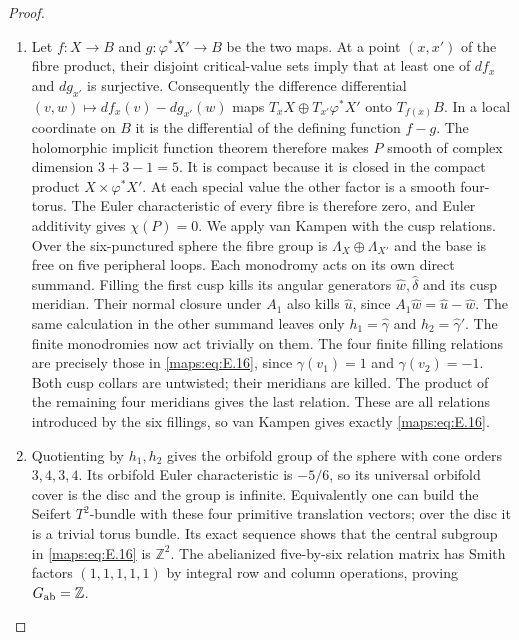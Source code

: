 \begin{proof}
\begin{enumerate}[label=\arabic*.,leftmargin=*]
\item Let $f:X\to B$ and $g:\varphi^*X'\to B$ be the two maps.
At a point $(x,x')$ of the fibre product, their disjoint critical-value
sets imply that at least one of $df_x$ and $dg_{x'}$ is surjective.
Consequently the difference differential
$(v,w)\mapsto df_x(v)-dg_{x'}(w)$ maps
$T_xX\oplus T_{x'}\varphi^*X'$ onto $T_{f(x)}B$.
In a local coordinate on $B$ it is the differential of the defining
function $f-g$. The holomorphic implicit function theorem therefore
makes $P$ smooth of complex dimension $3+3-1=5$.
It is compact because it is closed in the compact product
$X\times\varphi^*X'$.  At each special value the other
factor is a smooth four-torus.  The Euler characteristic of every
fibre is therefore zero, and Euler additivity gives $\chi(P)=0$.
We apply van Kampen with the cusp relations.
Over the six-punctured sphere the fibre group is
$\Lambda_X\oplus\Lambda_{X'}$ and the base is free on five
peripheral loops.  Each monodromy acts on its own direct summand.
Filling the first cusp kills its angular generators
$\widehat w,\widehat\delta$ and its cusp meridian.  Their normal
closure under $A_1$ also kills $\widehat u$, since
$A_1\widehat w=\widehat u-\widehat w$.  The same calculation
in the other summand leaves only $h_1=\widehat\gamma$ and
$h_2=\widehat\gamma'$.  The finite monodromies now act trivially
on them.  The four finite filling relations are precisely those
in \eqref{maps:eq:E.16}, since $\gamma(v_1)=1$ and $\gamma(v_2)=-1$.
Both cusp collars are untwisted; their meridians are killed.
The product of the remaining four meridians gives the last
relation.  These are all relations introduced by the six
fillings, so van Kampen gives exactly \eqref{maps:eq:E.16}.

\item Quotienting by $h_1,h_2$ gives the orbifold group of the sphere
with cone orders $3,4,3,4$.  Its orbifold Euler characteristic
is $-5/6$, so its universal orbifold cover is the disc and the
group is infinite.  Equivalently one can build the Seifert
$T^2$-bundle with these four primitive translation vectors; over
the disc it is a trivial torus bundle.  Its exact sequence shows
that the central subgroup in \eqref{maps:eq:E.16} is $\mathbb Z^2$.
The abelianized five-by-six relation matrix has Smith factors
$(1,1,1,1,1)$ by integral row and column operations, proving $G_{\rm ab}=\mathbb Z$.


\end{enumerate}
\end{proof}
